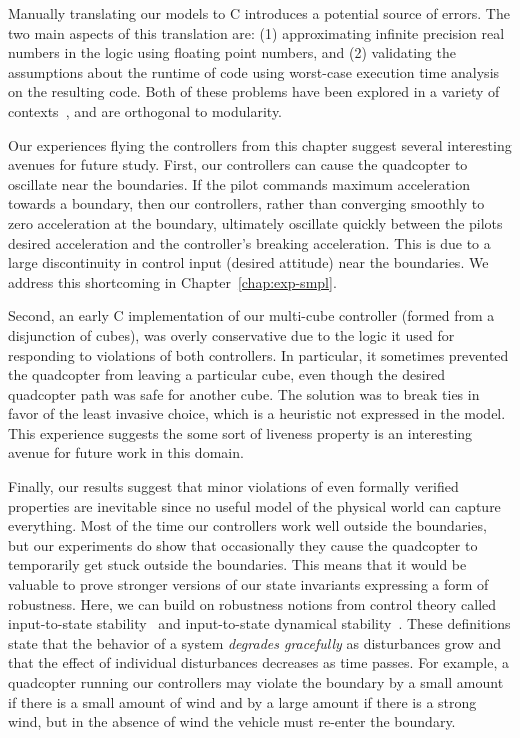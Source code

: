Manually translating our models to C introduces a potential source of
errors.  The two main aspects of this translation are: (1) approximating
infinite precision real numbers in the logic using floating point numbers,
and (2) validating the assumptions about the runtime of code using
worst-case execution time analysis on the resulting code.  Both of these
problems have been explored in a variety of
contexts~\cite{darulova2014sound,maroneze2014certified,wilhelm2008worst},
and are orthogonal to modularity.

Our experiences flying the controllers from this chapter suggest several
interesting avenues for future study.  First, our controllers can cause the
quadcopter to oscillate near the boundaries.  If the pilot commands maximum
acceleration towards a boundary, then our controllers, rather than
converging smoothly to zero acceleration at the boundary, ultimately
oscillate quickly between the pilots desired acceleration and the
controller's breaking acceleration.  This is due to a large discontinuity
in control input (desired attitude) near the boundaries. We address this
shortcoming in Chapter~\ref{chap:exp-smpl}.

Second, an early C implementation of our multi-cube controller (formed from
a disjunction of cubes), was overly conservative due to the logic it used
for responding to violations of both controllers.  In particular, it
sometimes prevented the quadcopter from leaving a particular cube, even
though the desired quadcopter path was safe for another cube.  The solution
was to break ties in favor of the least invasive choice, which is a
heuristic not expressed in the model. This experience suggests the some
sort of liveness property is an interesting avenue for future work in this
domain.
 
Finally, our results suggest that minor violations of even formally
verified properties are inevitable since no useful model of the physical
world can capture everything.  Most of the time our controllers work well
outside the boundaries, but our experiments do show that occasionally they
cause the quadcopter to temporarily get stuck outside the boundaries. This
means that it would be valuable to prove stronger versions of our state
invariants expressing a form of robustness. Here, we can build on
robustness notions from control theory called input-to-state
stability~\cite{ISSsontag2008} and input-to-state dynamical
stability~\cite{gruneISDS02}.  These definitions state that the behavior of
a system \emph{degrades gracefully} as disturbances grow and that the
effect of individual disturbances decreases as time passes.  For example, a
quadcopter running our controllers may violate the boundary by a small
amount if there is a small amount of wind and by a large amount if there is
a strong wind, but in the absence of wind the vehicle must re-enter the
boundary.

